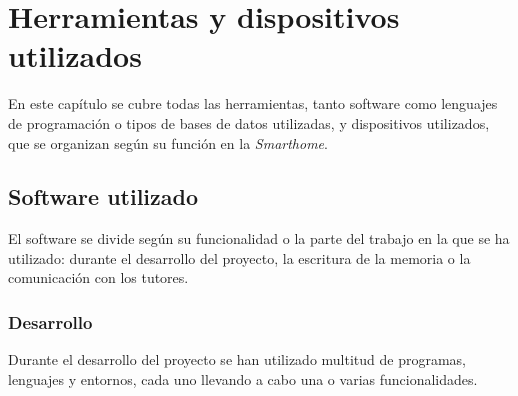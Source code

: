 \chapter{Herramientas y dispositivos utilizados}

En este capítulo se cubre todas las herramientas, tanto software como lenguajes de programación o tipos de bases de datos utilizadas, y dispositivos utilizados, que se organizan según su función en la \textit{Smarthome}.

\section{Software utilizado}

El software se divide según su funcionalidad o la parte del trabajo en la que se ha utilizado: durante el desarrollo del proyecto, la escritura de la memoria o la comunicación con los tutores.

\subsection{Desarrollo}

Durante el desarrollo del proyecto se han utilizado multitud de programas, lenguajes y entornos, cada uno llevando a cabo una o varias funcionalidades.

